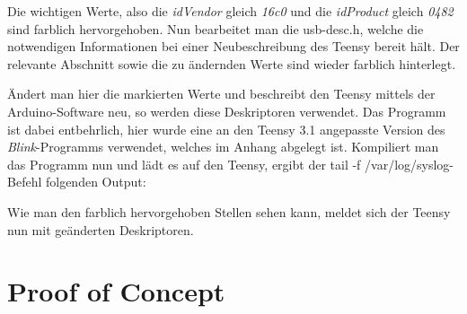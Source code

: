 \lstset{language=log}


Die wichtigen Werte, also die \textit{idVendor} gleich \textit{16c0} und die \textit{idProduct} gleich \textit{0482} sind farblich hervorgehoben. Nun bearbeitet man die usb-desc.h, welche die notwendigen Informationen bei einer Neubeschreibung des Teensy bereit hält. Der relevante Abschnitt sowie die zu ändernden Werte sind wieder farblich hinterlegt.

\lstset{language=C}


Ändert man hier die markierten Werte und beschreibt den Teensy mittels der Arduino-Software neu, so werden diese Deskriptoren verwendet. Das Programm ist dabei entbehrlich, hier wurde eine an den Teensy 3.1 angepasste Version des \textit{Blink}-Programms verwendet, welches im Anhang abgelegt ist. Kompiliert man das Programm nun und lädt es auf den Teensy, ergibt der \glqq tail -f /var/log/syslog\grqq -Befehl folgenden Output:

\lstset{language=log}


Wie man den farblich hervorgehoben Stellen sehen kann, meldet sich der Teensy nun mit geänderten Deskriptoren.

\section{Proof of Concept} \label{PoC}